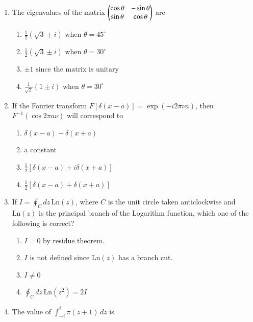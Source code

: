 \documentclass[journal,12pt,onecolumn]{IEEEtran}
\theoremstyle{remark}
\begin{document}
\begin{enumerate}
\item The eigenvalues of the matrix $
 \begin{pmatrix}
\cos\theta & -\sin\theta \\ \sin\theta & \cos\theta 
\end{pmatrix}$ are

\hfill{}
\begin{multicols}{2}
    \begin{enumerate}
        \item $\frac{1}{2}(\sqrt{3} \pm i) \text{ when } \theta = 45^\circ$
        \item $\frac{1}{2}(\sqrt{3} \pm i) \text{ when } \theta = 30^\circ$
        \item $\pm 1 \text{ since the matrix is unitary}$
        \item $\frac{1}{\sqrt{2}} (1 \pm i) \text{ when } \theta = 30^\circ$
    \end{enumerate}
\end{multicols}

\item If the Fourier transform $F[\delta(x-a)] = \exp(-i 2\pi \nu a)$, then $F^{-1}(\cos 2\pi a \nu)$ will correspond to

\hfill{}
\begin{multicols}{2}
    \begin{enumerate}
        \item $\delta(x-a) - \delta(x+a)$
        \item a constant
        \item $\frac{1}{2}[\delta(x-a) + i\delta(x+a)]$
        \item $\frac{1}{2}[\delta(x-a) + \delta(x+a)]$
    \end{enumerate}
\end{multicols}

\item If $I = \oint_C dz \, \mathrm{Ln}(z)$, where $C$ is the unit circle taken anticlockwise and $\mathrm{Ln}(z)$ is the principal branch of the Logarithm function, which one of the following is correct?

\hfill{}
\begin{multicols}{2}
    \begin{enumerate}
        \item $I = 0$ by residue theorem.
        \item $I$ is not defined since $\mathrm{Ln}(z)$ has a branch cut.
        \item $I \neq 0$
        \item $\oint_C dz \, \mathrm{Ln}(z^2) = 2I$
    \end{enumerate}
\end{multicols} 
\item The value of $ \int_{-i}^{i} \pi(z+1) \, dz$ is


\end{enumerate}
\end{document}
